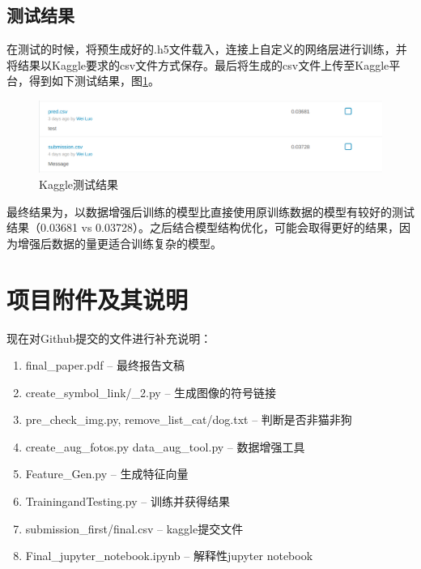 \documentclass[a4paper,11pt]{article}
\begin{document}
\subsection{测试结果}
\label{sec:org67d22bb}
在测试的时候，将预生成好的.h5文件载入，连接上自定义的网络层进行训练，并将结果以Kaggle要求的csv文件方式保存。最后将生成的csv文件上传至Kaggle平台，得到如下测试结果，图\ref{fig:kaggle}。

\begin{figure}[htb]
\centering
\includegraphics[scale=0.25]{./figure/record.png}
\caption{Kaggle测试结果}
\label{fig:kaggle}
\end{figure}

最终结果为，以数据增强后训练的模型比直接使用原训练数据的模型有较好的测试结果（0.03681 vs 0.03728）。之后结合模型结构优化，可能会取得更好的结果，因为增强后数据的量更适合训练复杂的模型。
\section{项目附件及其说明}
\label{sec:org63942ee}

现在对Github提交的文件进行补充说明： 
\begin{enumerate}
\item final\_paper.pdf -- 最终报告文稿
\item create\_symbol\_link/\_2.py -- 生成图像的符号链接
\item pre\_check\_img.py, remove\_list\_cat/dog.txt -- 判断是否非猫非狗
\item create\_aug\_fotos.py data\_aug\_tool.py  -- 数据增强工具
\item Feature\_Gen.py  -- 生成特征向量
\item TrainingandTesting.py -- 训练并获得结果
\item submission\_first/final.csv  -- kaggle提交文件
\item Final\_jupyter\_notebook.ipynb  -- 解释性jupyter notebook
\end{enumerate}
\end{document}
